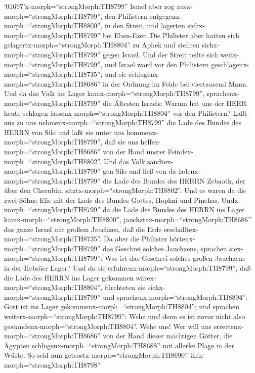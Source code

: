  `01697'x-morph=``strongMorph:TH8799'' Israel aber zog
ausx-morph=``strongMorph:TH8799'', den Philistern
entgegenx-morph=``strongMorph:TH8800'', in den Streit, und lagerten
sichx-morph=``strongMorph:TH8799'' bei Eben-Ezer. Die Philister aber
hatten sich gelagertx-morph=``strongMorph:TH8804'' zu Aphek 
und stellten sichx-morph=``strongMorph:TH8799'' gegen Israel. Und der
Streit teilte sich weitx-morph=``strongMorph:TH8799'', und Israel ward
vor den Philistern geschlagenx-morph=``strongMorph:TH8735''; und sie
schlugenx-morph=``strongMorph:TH8686'' in der Ordnung im Felde bei
viertausend Mann.  Und da das Volk ins Lager
kamx-morph=``strongMorph:TH8799'',
sprachenx-morph=``strongMorph:TH8799'' die Ältesten Israels: Warum hat
uns der HERR heute schlagen lassenx-morph=``strongMorph:TH8804'' vor den
Philistern? Laßt uns zu uns nehmenx-morph=``strongMorph:TH8799'' die
Lade des Bundes des HERRN von Silo und laßt sie unter uns
kommenx-morph=``strongMorph:TH8799'', daß sie uns
helfex-morph=``strongMorph:TH8686'' von der Hand unsrer
Feindex-morph=``strongMorph:TH8802''.  Und das Volk
sandtex-morph=``strongMorph:TH8799'' gen Silo und ließ von da
holenx-morph=``strongMorph:TH8799'' die Lade des Bundes des HERRN
Zebaoth, der über den Cherubim sitztx-morph=``strongMorph:TH8802''. Und
es waren da die zwei Söhne Elis mit der Lade des Bundes Gottes, Hophni
und Pinehas.  Undx-morph=``strongMorph:TH8799'' da die Lade
des Bundes des HERRN ins Lager kamx-morph=``strongMorph:TH8800'',
jauchztex-morph=``strongMorph:TH8686'' das ganze Israel mit großem
Jauchzen, daß die Erde erschalltex-morph=``strongMorph:TH8735''.
 Da aber die Philister hörtenx-morph=``strongMorph:TH8799''
das Geschrei solches Jauchzens, sprachen
siex-morph=``strongMorph:TH8799'': Was ist das Geschrei solches großen
Jauchzens in der Hebräer Lager? Und da sie
erfuhrenx-morph=``strongMorph:TH8799'', daß die Lade des HERRN ins Lager
gekommen wärex-morph=``strongMorph:TH8804'',  fürchteten sie
sichx-morph=``strongMorph:TH8799'' und
sprachenx-morph=``strongMorph:TH8804'': Gott ist ins Lager
gekommenx-morph=``strongMorph:TH8804''; und sprachen
weiterx-morph=``strongMorph:TH8799'': Wehe uns! denn es ist zuvor nicht
also gestandenx-morph=``strongMorph:TH8804''.  Wehe uns! Wer
will uns errettenx-morph=``strongMorph:TH8686'' von der Hand dieser
mächtigen Götter, die Ägypten schlugenx-morph=``strongMorph:TH8688'' mit
allerlei Plage in der Wüste.  So seid nun
getrostx-morph=``strongMorph:TH8690'' ihrx-morph=``strongMorph:TH8798''
